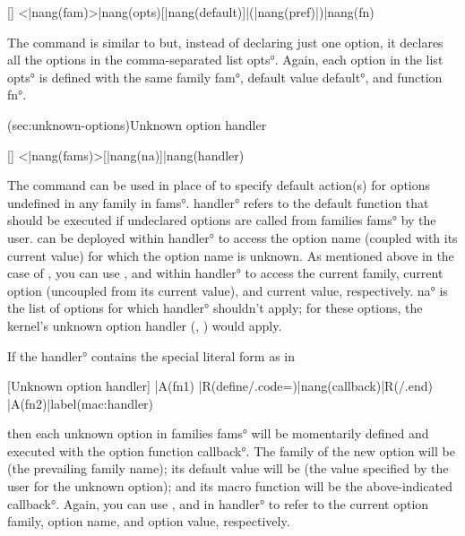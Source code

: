 \documentclass[
  use-a4-paper,
  use-10pt-font,
  final-version,
  use-UK-English,
  fancy-section-headings,
  frame-section-numbers,
  para-abstract-style,
  input-config-file,
  no-hyperref-messages
]{amltxdoc}
\def\xdecs{\fx{\XDeclareOption}\Redstar\sspace}
\begin{document}
[\XDeclareSwitchOptions]
\XDeclareSwitchOptions<|nang(fam)>{|nang(opts)}[|nang(default)]|(|nang(pref)|){|nang(fn)}
\fxim*{\XDeclareSwitchOptions}

The command \fx{\XDeclareSwitchOptions} is similar to \fx{\XDeclareSwitchOption} but, instead of declaring just one option, it declares all the options in the comma-separated list \ang{opts}. Again, each option in the list \ang{opts} is defined with the same family \ang{fam}, default value \ang{default}, and function \ang{fn}.


\docsubsection(sec:unknown-options){Unknown option handler}

[\XUnknownOptionHandler]
\XUnknownOptionHandler<|nang(fams)>[|nang(na)]{|nang(handler)}
\fxim*{\XUnknownOptionHandler}

The command \fx{\XUnknownOptionHandler} can be used in place of \xdecs to specify default action(s) for options undefined in any family in \ang{fams}. \ang{handler} refers to the default function that should be executed if undeclared options are called from families \ang{fams} by the user. \hx{\CurrentOption} can be deployed within \ang{handler} to access the option name (coupled with its current value) for which the option name is unknown. As mentioned above in the case of \xdecs, you can use ,  and  within \ang{handler} to access the current family, current option (uncoupled from its current value), and current value, respectively. \ang{na} is the list of options for which \ang{handler} shouldn't apply; for these options, the kernel's unknown option handler (\ie, ) would apply.

If the \ang{handler} contains the special literal form  as in

[Unknown option handler]
|A(fn1) |R(define/.code=)|nang(callback)|R(/.end) |A(fn2)|label(mac:handler)

then each unknown option in families \ang{fams} will be momentarily defined and executed with the option function \ang{callback}. The family of the new option will be \fx{\cpt@currfam} (the prevailing family name); its default value will be \fx{\cpt@currval} (the value specified by the user for the unknown option); and its macro function will be the above-indicated \ang{callback}. Again, you can use ,  and  in \ang{handler} to refer to the current option family, option name, and option value, respectively.
\end{document}
